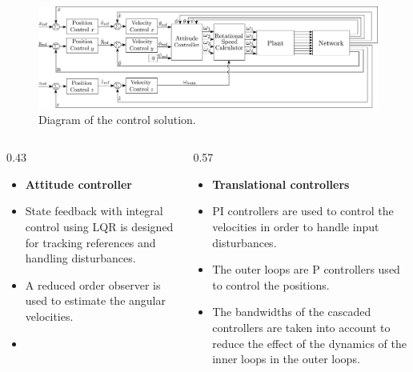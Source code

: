 \vspace{-1cm}
\begin{figure}
	\includegraphics[width=0.88\linewidth]{figures/TranslationalControlDiagram}
	\caption{Diagram of the control solution.}
\end{figure}

\begin{columns}[t,totalwidth=\twocolwid] %

	\begin{column}{0.43\twocolwid} %
  	 \centering
  	 \hspace{-2cm}
  	 \parbox{.88\textwidth}{
    	 \begin{itemize}
  	 			\item[]\textbf{Attitude controller}\\
  	 			\item State feedback with integral control using LQR is designed for tracking references and handling disturbances.
  	 			\item A reduced order observer is used to estimate the angular velocities.
  	 			\item[]\vspace{5pt}
  	 		\end{itemize}
  	 }
	\end{column} %
	\hspace{-4cm}
	\begin{column}{0.57\twocolwid} %
  	 \centering
   	 \parbox{1\textwidth}{
       	 \begin{itemize}
    	 			\item[]\textbf{Translational controllers}\\
     	 			\item PI controllers are used to control the velocities in order to handle input disturbances.
     	 			\item The outer loops are P controllers used to control the positions.
     	 			\item The bandwidths of the cascaded controllers are taken into account to reduce the effect of the dynamics of the inner loops in the outer loops.
       	 \end{itemize}		
   	 }
	\end{column} %
	\vspace{-.5cm}
\end{columns} %